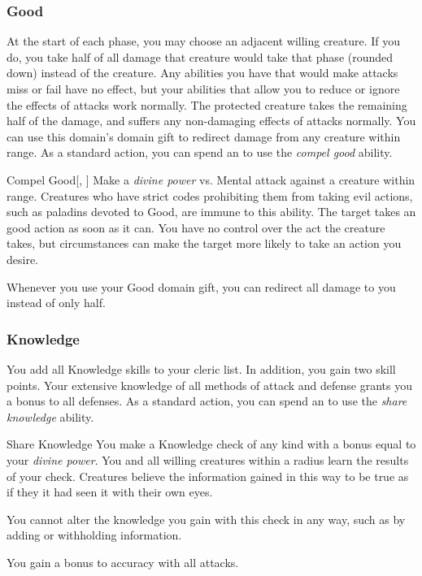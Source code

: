         \subsubsection{Good}
             At the start of each phase, you may choose an adjacent willing creature.
            If you do, you take half of all damage that creature would take that phase (rounded down) instead of the creature.
            Any abilities you have that would make attacks miss or fail have no effect, but your abilities that allow you to reduce or ignore the effects of attacks work normally.
            The protected creature takes the remaining half of the damage, and suffers any non-damaging effects of attacks normally.
             You can use this domain's domain gift to redirect damage from any creature within \rngclose range.
             As a standard action, you can spend an  to use the \textit{compel good} ability.
            \begin{ability}{Compel Good}[, ]
                Make a \textit{divine power} vs. Mental attack against a creature within \rngmed range.
                Creatures who have strict codes prohibiting them from taking evil actions, such as paladins devoted to Good, are immune to this ability.
                \hit The target takes an good action as soon as it can.
                You have no control over the act the creature takes, but circumstances can make the target more likely to take an action you desire.
            \end{ability}
             Whenever you use your Good domain gift, you can redirect all damage to you instead of only half.

        \subsubsection{Knowledge}
             You add all Knowledge skills to your cleric  list.
            In addition, you gain two skill points.
             Your extensive knowledge of all methods of attack and defense grants you a  bonus to all defenses.
             As a standard action, you can spend an  to use the \textit{share knowledge} ability.
            \begin{ability}{Share Knowledge}
                You make a Knowledge check of any kind with a bonus equal to your \textit{divine power}.
                You and all willing creatures within a \arealarge radius learn the results of your check.
                Creatures believe the information gained in this way to be true as if they it had seen it with their own eyes.

                You cannot alter the knowledge you gain with this check in any way, such as by adding or withholding information.
            \end{ability}
             You gain a  bonus to accuracy with all attacks.

